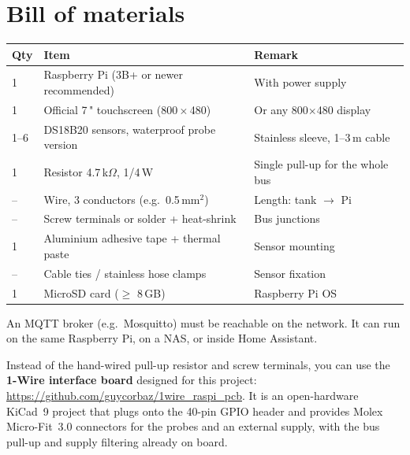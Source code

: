 \documentclass[11pt,a4paper,parskip=half]{scrartcl}
\begin{document}
\section{Bill of materials}

\begin{center}
\begin{tabularx}{\textwidth}{@{}lXl@{}}
\toprule
\textbf{Qty} & \textbf{Item} & \textbf{Remark}\\
\midrule
1 & Raspberry Pi (3B+ or newer recommended) & With power supply\\
1 & Official 7\," touchscreen (800\,$\times$\,480) & Or any 800$\times$480 display\\
1--6 & DS18B20 sensors, waterproof probe version & Stainless sleeve, 1--3\,m cable\\
1 & Resistor 4.7\,k$\Omega$, 1/4\,W & Single pull-up for the whole bus\\
-- & Wire, 3 conductors (e.g.\ 0.5\,mm$^2$) & Length: tank $\rightarrow$ Pi\\
-- & Screw terminals or solder + heat-shrink & Bus junctions\\
1 & Aluminium adhesive tape + thermal paste & Sensor mounting\\
-- & Cable ties / stainless hose clamps & Sensor fixation\\
1 & MicroSD card ($\geq$ 8\,GB) & Raspberry Pi OS\\
\bottomrule
\end{tabularx}
\end{center}

\begin{note}
An MQTT broker (e.g.\ Mosquitto) must be reachable on the network. It can run
on the same Raspberry Pi, on a NAS, or inside Home Assistant.
\end{note}

\begin{tip}[title={Dedicated interface PCB}]
Instead of the hand-wired pull-up resistor and screw terminals, you can use
the \textbf{1-Wire interface board} designed for this project:
\url{https://github.com/guycorbaz/1wire_raspi_pcb}. It is an open-hardware
KiCad~9 project that plugs onto the 40-pin GPIO header and provides Molex
Micro-Fit~3.0 connectors for the probes and an external supply, with the bus
pull-up and supply filtering already on board.
\end{tip}
\end{document}
